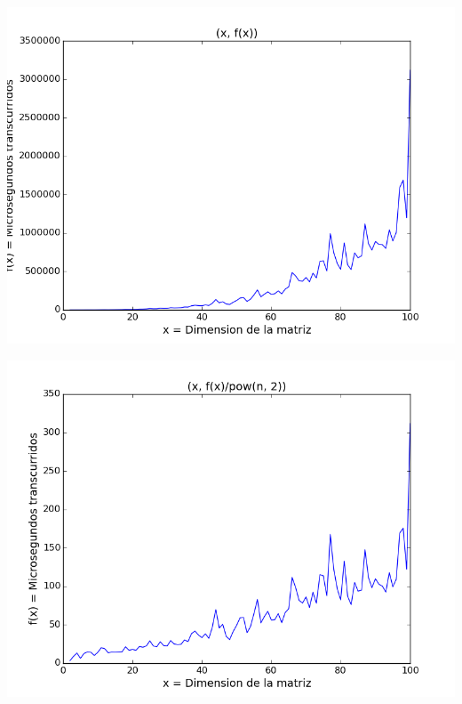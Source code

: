 \begin{center}
\includegraphics[scale=0.54]{images/3potenciafuncion}
\end{center}


\begin{center}
\includegraphics[scale=0.54]{images/3potenciasobrecuadrado}
\end{center}


